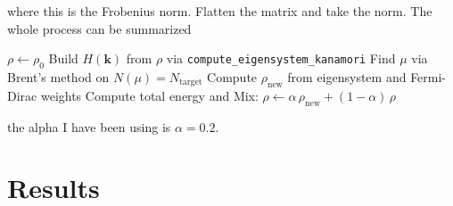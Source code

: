 \documentclass[11pt]{article}
\begin{document}
where this is the Frobenius norm. Flatten the matrix and take the norm. The whole process can be summarized
\begin{algorithm}[h]
\caption{Kanamori Self-Consistent Field}
\label{alg:kanamori_scf}
\begin{algorithmic}[1]
\State $\rho \leftarrow \rho_0$ 
    \State Build $H(\mathbf{k})$ from $\rho$ via \texttt{compute\_eigensystem\_kanamori}
    \State Find $\mu$ via Brent's method on $N(\mu) = N_{\text{target}}$
    \State Compute $\rho_{\text{new}}$ from eigensystem and Fermi-Dirac weights
        \State Compute total energy and \Return
    \EndIf
    \State Mix: $\rho \leftarrow \alpha\, \rho_{\text{new}} + (1-\alpha)\, \rho$
\EndFor
\end{algorithmic}
\end{algorithm}

the alpha I have been using is $\alpha = 0.2$.

\section{Results}
\end{document}
